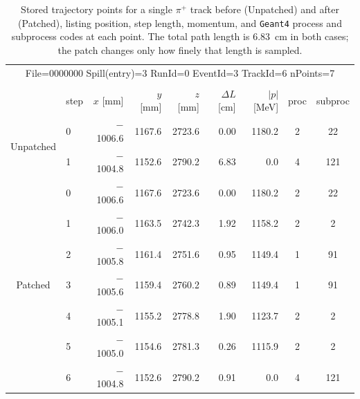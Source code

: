\documentclass[%
article,
nofootinbib
]{revtex4-2}
\DeclareRobustCommand{\gfour}{\texttt{Geant4}}
\begin{document}
\begin{table}[H]
\centering
\caption{Stored trajectory points for a single $\pi^{+}$ track before
(Unpatched) and after (Patched), listing position, step length, momentum,
and \gfour{} process and subprocess codes at each point. The total path
length is 6.83~cm in both cases; the patch changes only how finely that
length is sampled.}
\label{tab:traj_patch_dump}
\setlength{\tabcolsep}{12pt}
\begin{tabular}{clrrrrrcc}
\hline\hline
\multicolumn{9}{c}{File=0000000 \quad Spill(entry)=3 \quad RunId=0 \quad EventId=3 \quad TrackId=6 \quad nPoints=7} \\ \\
\hline
& step & $x$ [mm] & $y$ [mm] & $z$ [mm] & $\Delta L$ [cm] & $|p|$ [MeV] & proc & subproc \\
\hline
\multirow{2}{*}{Unpatched}
& 0 & $-$1006.6 & 1167.6 & 2723.6 & 0.00 & 1180.2 & 2 & 22 \\
& 1 & $-$1004.8 & 1152.6 & 2790.2 & 6.83 & 0.0    & 4 & 121 \\
\hline
\multirow{7}{*}{Patched}
& 0 & $-$1006.6 & 1167.6 & 2723.6 & 0.00 & 1180.2 & 2 & 22 \\
& 1 & $-$1006.0 & 1163.5 & 2742.3 & 1.92 & 1158.2 & 2 & 2 \\
& 2 & $-$1005.8 & 1161.4 & 2751.6 & 0.95 & 1149.4 & 1 & 91 \\
& 3 & $-$1005.6 & 1159.4 & 2760.2 & 0.89 & 1149.4 & 1 & 91 \\
& 4 & $-$1005.1 & 1155.2 & 2778.8 & 1.90 & 1123.7 & 2 & 2 \\
& 5 & $-$1005.0 & 1154.6 & 2781.3 & 0.26 & 1115.9 & 2 & 2 \\
& 6 & $-$1004.8 & 1152.6 & 2790.2 & 0.91 & 0.0    & 4 & 121 \\
\hline\hline
\end{tabular}
\end{table}

\end{document}
